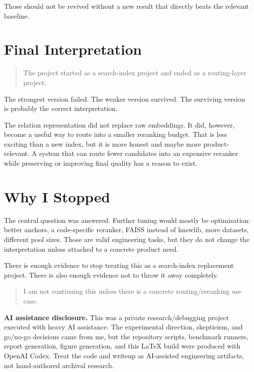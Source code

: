 \documentclass[10pt]{article}
\begin{document}
Those should not be revived without a new result that directly beats the relevant baseline.

\section*{Final Interpretation}

\begin{quote}
The project started as a search-index project and ended as a routing-layer project.
\end{quote}

The strongest version failed. The weaker version survived. The surviving version is probably the correct interpretation.

The relation representation did not replace raw embeddings. It did, however, become a useful way to route into a smaller reranking budget. That is less exciting than a new index, but it is more honest and maybe more product-relevant. A system that can route fewer candidates into an expensive reranker while preserving or improving final quality has a reason to exist.

\section*{Why I Stopped}

The central question was answered. Further tuning would mostly be optimization: better anchors, a code-specific reranker, FAISS instead of hnswlib, more datasets, different pool sizes. Those are valid engineering tasks, but they do not change the interpretation unless attached to a concrete product need.

There is enough evidence to stop treating this as a search-index replacement project. There is also enough evidence not to throw it away completely.

\begin{quote}
I am not continuing this unless there is a concrete routing/reranking use case.
\end{quote}

\vfill
\footnotesize
\textbf{AI assistance disclosure.} This was a private research/debugging project executed with heavy AI assistance. The experimental direction, skepticism, and go/no-go decisions came from me, but the repository scripts, benchmark runners, report generation, figure generation, and this LaTeX build were produced with OpenAI Codex. Treat the code and writeup as AI-assisted engineering artifacts, not hand-authored archival research.
\end{document}
